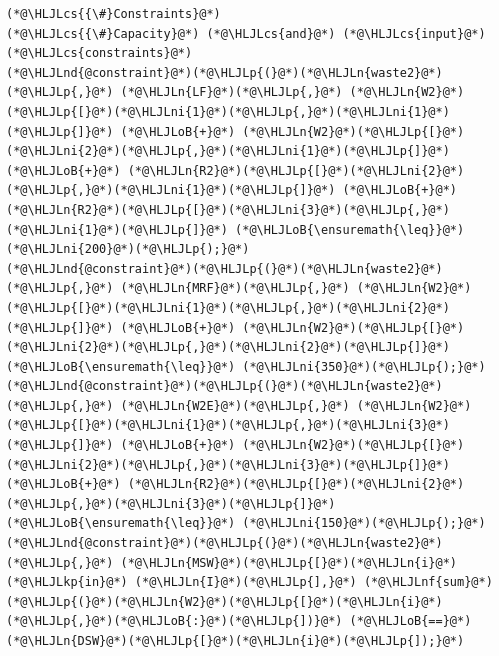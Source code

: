 \documentclass[12pt,a4paper]{article}
\newcommand{\HLJLkp}[1]{\textcolor[RGB]{148,91,176}{\textbf{#1}}}
\newcommand{\HLJLn}[1]{#1}
\newcommand{\HLJLnd}[1]{\textcolor[RGB]{214,102,97}{#1}}
\newcommand{\HLJLnf}[1]{\textcolor[RGB]{66,102,213}{#1}}
\newcommand{\HLJLni}[1]{\textcolor[RGB]{59,151,46}{#1}}
\newcommand{\HLJLoB}[1]{\textcolor[RGB]{102,102,102}{\textbf{#1}}}
\newcommand{\HLJLp}[1]{#1}
\newcommand{\HLJLcs}[1]{\textcolor[RGB]{153,153,119}{\textit{#1}}}
\begin{document}
\begin{lstlisting}
(*@\HLJLcs{{\#}Constraints}@*)
(*@\HLJLcs{{\#}Capacity}@*) (*@\HLJLcs{and}@*) (*@\HLJLcs{input}@*) (*@\HLJLcs{constraints}@*)
(*@\HLJLnd{@constraint}@*)(*@\HLJLp{(}@*)(*@\HLJLn{waste2}@*)(*@\HLJLp{,}@*) (*@\HLJLn{LF}@*)(*@\HLJLp{,}@*) (*@\HLJLn{W2}@*)(*@\HLJLp{[}@*)(*@\HLJLni{1}@*)(*@\HLJLp{,}@*)(*@\HLJLni{1}@*)(*@\HLJLp{]}@*) (*@\HLJLoB{+}@*) (*@\HLJLn{W2}@*)(*@\HLJLp{[}@*)(*@\HLJLni{2}@*)(*@\HLJLp{,}@*)(*@\HLJLni{1}@*)(*@\HLJLp{]}@*) (*@\HLJLoB{+}@*) (*@\HLJLn{R2}@*)(*@\HLJLp{[}@*)(*@\HLJLni{2}@*)(*@\HLJLp{,}@*)(*@\HLJLni{1}@*)(*@\HLJLp{]}@*) (*@\HLJLoB{+}@*) (*@\HLJLn{R2}@*)(*@\HLJLp{[}@*)(*@\HLJLni{3}@*)(*@\HLJLp{,}@*)(*@\HLJLni{1}@*)(*@\HLJLp{]}@*) (*@\HLJLoB{\ensuremath{\leq}}@*) (*@\HLJLni{200}@*)(*@\HLJLp{);}@*)
(*@\HLJLnd{@constraint}@*)(*@\HLJLp{(}@*)(*@\HLJLn{waste2}@*)(*@\HLJLp{,}@*) (*@\HLJLn{MRF}@*)(*@\HLJLp{,}@*) (*@\HLJLn{W2}@*)(*@\HLJLp{[}@*)(*@\HLJLni{1}@*)(*@\HLJLp{,}@*)(*@\HLJLni{2}@*)(*@\HLJLp{]}@*) (*@\HLJLoB{+}@*) (*@\HLJLn{W2}@*)(*@\HLJLp{[}@*)(*@\HLJLni{2}@*)(*@\HLJLp{,}@*)(*@\HLJLni{2}@*)(*@\HLJLp{]}@*) (*@\HLJLoB{\ensuremath{\leq}}@*) (*@\HLJLni{350}@*)(*@\HLJLp{);}@*)
(*@\HLJLnd{@constraint}@*)(*@\HLJLp{(}@*)(*@\HLJLn{waste2}@*)(*@\HLJLp{,}@*) (*@\HLJLn{W2E}@*)(*@\HLJLp{,}@*) (*@\HLJLn{W2}@*)(*@\HLJLp{[}@*)(*@\HLJLni{1}@*)(*@\HLJLp{,}@*)(*@\HLJLni{3}@*)(*@\HLJLp{]}@*) (*@\HLJLoB{+}@*) (*@\HLJLn{W2}@*)(*@\HLJLp{[}@*)(*@\HLJLni{2}@*)(*@\HLJLp{,}@*)(*@\HLJLni{3}@*)(*@\HLJLp{]}@*) (*@\HLJLoB{+}@*) (*@\HLJLn{R2}@*)(*@\HLJLp{[}@*)(*@\HLJLni{2}@*)(*@\HLJLp{,}@*)(*@\HLJLni{3}@*)(*@\HLJLp{]}@*) (*@\HLJLoB{\ensuremath{\leq}}@*) (*@\HLJLni{150}@*)(*@\HLJLp{);}@*)
(*@\HLJLnd{@constraint}@*)(*@\HLJLp{(}@*)(*@\HLJLn{waste2}@*)(*@\HLJLp{,}@*) (*@\HLJLn{MSW}@*)(*@\HLJLp{[}@*)(*@\HLJLn{i}@*) (*@\HLJLkp{in}@*) (*@\HLJLn{I}@*)(*@\HLJLp{],}@*) (*@\HLJLnf{sum}@*)(*@\HLJLp{(}@*)(*@\HLJLn{W2}@*)(*@\HLJLp{[}@*)(*@\HLJLn{i}@*)(*@\HLJLp{,}@*)(*@\HLJLoB{:}@*)(*@\HLJLp{])}@*) (*@\HLJLoB{==}@*) (*@\HLJLn{DSW}@*)(*@\HLJLp{[}@*)(*@\HLJLn{i}@*)(*@\HLJLp{]);}@*)


\end{lstlisting}
\end{document}
